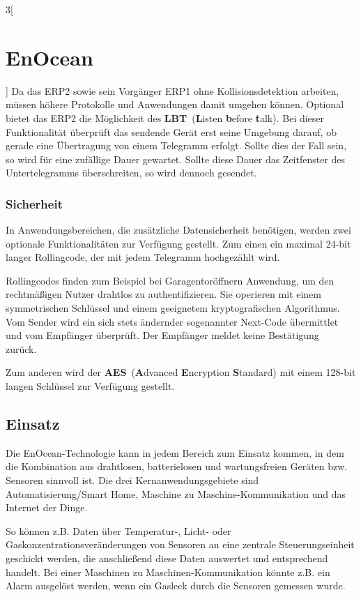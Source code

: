 \begin{multicols}{3}[\section{EnOcean}]
Da das ERP2 sowie sein Vorgänger ERP1 ohne Kollisionsdetektion arbeiten, müssen höhere Protokolle und Anwendungen damit umgehen können. Optional bietet das ERP2 die Möglichkeit des \textbf{LBT}~(\textbf{L}isten \textbf{b}efore \textbf{t}alk). Bei dieser Funktionalität überprüft das sendende Gerät erst seine Umgebung darauf, ob gerade eine Übertragung von einem Telegramm erfolgt. Sollte dies der Fall sein, so wird für eine zufällige Dauer gewartet. Sollte diese Dauer das Zeitfenster des Untertelegramms überschreiten, so wird dennoch gesendet.~\cite{enocean.6}

\subsubsection*{Sicherheit}
In Anwendungsbereichen, die zusätzliche Datensicherheit benötigen, werden zwei optionale Funktionalitäten zur Verfügung gestellt. Zum einen ein maximal 24-bit langer Rollingcode, der mit jedem Telegramm hochgezählt wird.~\cite{enocean.1}

Rollingcodes finden zum Beispiel bei Garagentoröffnern Anwendung, um den rechtmäßigen Nutzer drahtlos zu authentifizieren. Sie operieren mit einem symmetrischen Schlüssel und einem geeignetem kryptografischen Algorithmus. Vom Sender wird ein sich stets ändernder sogenannter Next-Code übermittlet und vom Empfänger überprüft. Der Empfänger meldet keine Bestätigung zurück.~\cite{enocean.7}

Zum anderen wird der \textbf{AES}~(\textbf{A}dvanced \textbf{E}ncryption \textbf{S}tandard) mit einem 128-bit langen Schlüssel zur Verfügung gestellt.~\cite{enocean.1}

\subsection*{Einsatz}
Die EnOcean-Technologie kann in jedem Bereich zum Einsatz kommen, in dem die Kombination aus drahtlosen, batterielosen und wartungsfreien Geräten bzw. Sensoren sinnvoll ist. Die drei Kernanwendungsgebiete sind Automatisierung/Smart Home, Maschine zu Maschine-Kommunikation und das Internet der Dinge.

So können z.B. Daten über Temperatur-, Licht- oder Gaskonzentrationsveränderungen von Sensoren an eine zentrale Steuerungseinheit geschickt werden, die anschließend diese Daten auswertet und entsprechend handelt. Bei einer Maschinen zu Maschinen-Kommunikation könnte z.B. ein Alarm ausgelöst werden, wenn ein Gasleck durch die Sensoren gemessen wurde.~\cite{enocean.1}


\end{multicols}
